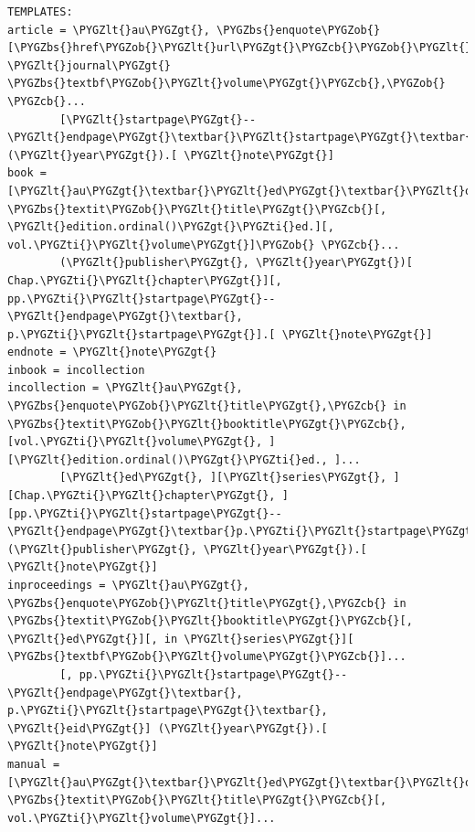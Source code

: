 \documentclass[letterpaper,10pt,english]{sphinxmanual}
\def\PYGZbs{\char`\\}
\def\PYGZob{\char`\{}
\def\PYGZcb{\char`\}}
\def\PYGZlt{\char`\<}
\def\PYGZgt{\char`\>}
\def\PYGZti{\char`\~}
\begin{document}
\begin{Verbatim}[commandchars=\\\{\}]
TEMPLATES:
article = \PYGZlt{}au\PYGZgt{}, \PYGZbs{}enquote\PYGZob{}[\PYGZbs{}href\PYGZob{}\PYGZlt{}url\PYGZgt{}\PYGZcb{}\PYGZob{}\PYGZlt{}title\PYGZgt{}\PYGZcb{}\textbar{}\PYGZbs{}href\PYGZob{}\PYGZlt{}doi\PYGZgt{}\PYGZcb{}\PYGZob{}\PYGZlt{}title\PYGZgt{}\PYGZcb{}\textbar{}\PYGZlt{}title\PYGZgt{}],\PYGZcb{} \PYGZlt{}journal\PYGZgt{} \PYGZbs{}textbf\PYGZob{}\PYGZlt{}volume\PYGZgt{}\PYGZcb{},\PYGZob{} \PYGZcb{}...
        [\PYGZlt{}startpage\PYGZgt{}--\PYGZlt{}endpage\PYGZgt{}\textbar{}\PYGZlt{}startpage\PYGZgt{}\textbar{}\PYGZlt{}eid\PYGZgt{}\textbar{}] (\PYGZlt{}year\PYGZgt{}).[ \PYGZlt{}note\PYGZgt{}]
book = [\PYGZlt{}au\PYGZgt{}\textbar{}\PYGZlt{}ed\PYGZgt{}\textbar{}\PYGZlt{}organization\PYGZgt{}\textbar{}\PYGZlt{}institution\PYGZgt{}\textbar{}], \PYGZbs{}textit\PYGZob{}\PYGZlt{}title\PYGZgt{}\PYGZcb{}[, \PYGZlt{}edition.ordinal()\PYGZgt{}\PYGZti{}ed.][, vol.\PYGZti{}\PYGZlt{}volume\PYGZgt{}]\PYGZob{} \PYGZcb{}...
        (\PYGZlt{}publisher\PYGZgt{}, \PYGZlt{}year\PYGZgt{})[ Chap.\PYGZti{}\PYGZlt{}chapter\PYGZgt{}][, pp.\PYGZti{}\PYGZlt{}startpage\PYGZgt{}--\PYGZlt{}endpage\PYGZgt{}\textbar{}, p.\PYGZti{}\PYGZlt{}startpage\PYGZgt{}].[ \PYGZlt{}note\PYGZgt{}]
endnote = \PYGZlt{}note\PYGZgt{}
inbook = incollection
incollection = \PYGZlt{}au\PYGZgt{}, \PYGZbs{}enquote\PYGZob{}\PYGZlt{}title\PYGZgt{},\PYGZcb{} in \PYGZbs{}textit\PYGZob{}\PYGZlt{}booktitle\PYGZgt{}\PYGZcb{}, [vol.\PYGZti{}\PYGZlt{}volume\PYGZgt{}, ][\PYGZlt{}edition.ordinal()\PYGZgt{}\PYGZti{}ed., ]...
        [\PYGZlt{}ed\PYGZgt{}, ][\PYGZlt{}series\PYGZgt{}, ][Chap.\PYGZti{}\PYGZlt{}chapter\PYGZgt{}, ][pp.\PYGZti{}\PYGZlt{}startpage\PYGZgt{}--\PYGZlt{}endpage\PYGZgt{}\textbar{}p.\PYGZti{}\PYGZlt{}startpage\PYGZgt{}\textbar{}\PYGZlt{}eid\PYGZgt{}\textbar{}] (\PYGZlt{}publisher\PYGZgt{}, \PYGZlt{}year\PYGZgt{}).[ \PYGZlt{}note\PYGZgt{}]
inproceedings = \PYGZlt{}au\PYGZgt{}, \PYGZbs{}enquote\PYGZob{}\PYGZlt{}title\PYGZgt{},\PYGZcb{} in \PYGZbs{}textit\PYGZob{}\PYGZlt{}booktitle\PYGZgt{}\PYGZcb{}[, \PYGZlt{}ed\PYGZgt{}][, in \PYGZlt{}series\PYGZgt{}][ \PYGZbs{}textbf\PYGZob{}\PYGZlt{}volume\PYGZgt{}\PYGZcb{}]...
        [, pp.\PYGZti{}\PYGZlt{}startpage\PYGZgt{}--\PYGZlt{}endpage\PYGZgt{}\textbar{}, p.\PYGZti{}\PYGZlt{}startpage\PYGZgt{}\textbar{}, \PYGZlt{}eid\PYGZgt{}] (\PYGZlt{}year\PYGZgt{}).[ \PYGZlt{}note\PYGZgt{}]
manual = [\PYGZlt{}au\PYGZgt{}\textbar{}\PYGZlt{}ed\PYGZgt{}\textbar{}\PYGZlt{}organization\PYGZgt{}\textbar{}\PYGZlt{}institution\PYGZgt{}\textbar{}], \PYGZbs{}textit\PYGZob{}\PYGZlt{}title\PYGZgt{}\PYGZcb{}[, vol.\PYGZti{}\PYGZlt{}volume\PYGZgt{}]...

\end{Verbatim}
\end{document}
